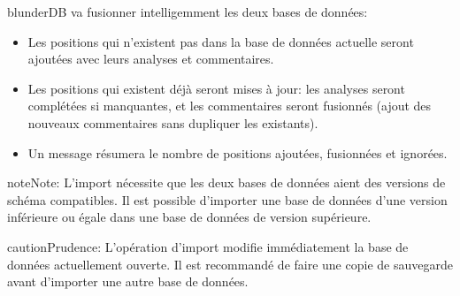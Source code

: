 \documentclass[letterpaper,10pt,french]{sphinxmanual}
\begin{document}
\sphinxAtStartPar
blunderDB va fusionner intelligemment les deux bases de données:
\begin{itemize}
\item {} 
\sphinxAtStartPar
Les positions qui n’existent pas dans la base de données actuelle seront
ajoutées avec leurs analyses et commentaires.

\item {} 
\sphinxAtStartPar
Les positions qui existent déjà seront mises à jour: les analyses seront
complétées si manquantes, et les commentaires seront fusionnés (ajout des
nouveaux commentaires sans dupliquer les existants).

\item {} 
\sphinxAtStartPar
Un message résumera le nombre de positions ajoutées, fusionnées et ignorées.

\end{itemize}

\begin{sphinxadmonition}{note}{Note:}
\sphinxAtStartPar
L’import nécessite que les deux bases de données aient des versions de schéma
compatibles. Il est possible d’importer une base de données d’une version
inférieure ou égale dans une base de données de version supérieure.
\end{sphinxadmonition}

\begin{sphinxadmonition}{caution}{Prudence:}
\sphinxAtStartPar
L’opération d’import modifie immédiatement la base de données actuellement
ouverte. Il est recommandé de faire une copie de sauvegarde avant d’importer
une autre base de données.
\end{sphinxadmonition}
\end{document}
